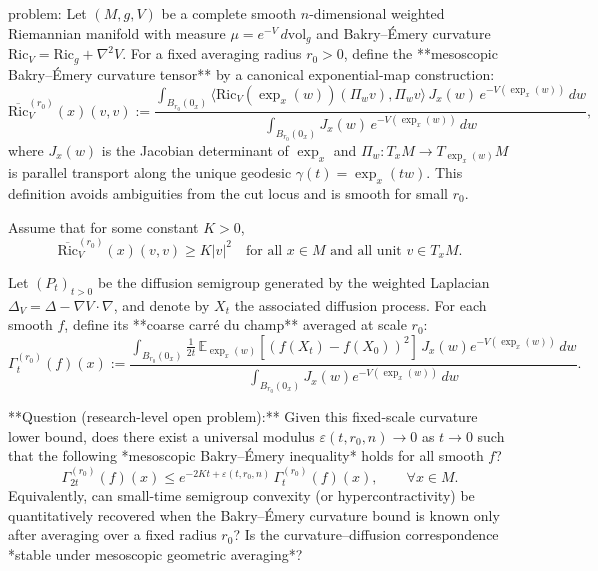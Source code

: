 problem:  
Let \((M,g,V)\) be a complete smooth \(n\)-dimensional weighted Riemannian manifold with measure  
\(\mu = e^{-V}\,d\mathrm{vol}_g\) and Bakry–Émery curvature \(\mathrm{Ric}_V = \mathrm{Ric}_g + \nabla^2V\).  
For a fixed averaging radius \(r_0>0\), define the **mesoscopic Bakry–Émery curvature tensor** by a canonical exponential-map construction:
\[
\overline{\mathrm{Ric}}^{(r_0)}_V(x)(v,v)
:= \frac{\int_{B_{r_0}(0_x)} 
      \langle \mathrm{Ric}_V(\exp_x(w))(\Pi_{w} v),\Pi_{w} v\rangle\,
      J_x(w)\, e^{-V(\exp_x(w))} \,dw}
      {\int_{B_{r_0}(0_x)} J_x(w)\, e^{-V(\exp_x(w))}\,dw},
\]
where \(J_x(w)\) is the Jacobian determinant of \(\exp_x\) and \(\Pi_w\colon T_xM\to T_{\exp_x(w)}M\) is parallel transport along the unique geodesic \(\gamma(t)=\exp_x(tw)\).  
This definition avoids ambiguities from the cut locus and is smooth for small \(r_0\).

Assume that for some constant \(K>0\),
\[
\overline{\mathrm{Ric}}^{(r_0)}_V(x)(v,v)\ge K|v|^2
\quad \text{for all }x\in M\text{ and all unit }v\in T_xM.
\]

Let \((P_t)_{t>0}\) be the diffusion semigroup generated by the weighted Laplacian \(\Delta_V = \Delta - \nabla V\cdot\nabla\), and denote by \(X_t\) the associated diffusion process.  
For each smooth \(f\), define its **coarse carré du champ** averaged at scale \(r_0\):
\[
\Gamma_t^{(r_0)}(f)(x)
  := \frac{\int_{B_{r_0}(0_x)} 
         \frac{1}{2t}\,\mathbb{E}_{\exp_x(w)}[(f(X_t)-f(X_0))^2]\,
         J_x(w)e^{-V(\exp_x(w))}\,dw}
       {\int_{B_{r_0}(0_x)}J_x(w)e^{-V(\exp_x(w))}\,dw}.
\]

**Question (research-level open problem):**  
Given this fixed-scale curvature lower bound,
does there exist a universal modulus \(\varepsilon(t,r_0,n)\to 0\) as \(t\to 0\) such that the following *mesoscopic Bakry–Émery inequality* holds for all smooth \(f\)?
\[
\Gamma_{2t}^{(r_0)}(f)(x)
   \le e^{-2Kt+\varepsilon(t,r_0,n)}\,
        \Gamma_t^{(r_0)}(f)(x), \qquad \forall x\in M.
\]
Equivalently, can small-time semigroup convexity (or hypercontractivity) be quantitatively recovered when the Bakry–Émery curvature bound is known only after averaging over a fixed radius \(r_0\)?  
Is the curvature–diffusion correspondence *stable under mesoscopic geometric averaging*?

